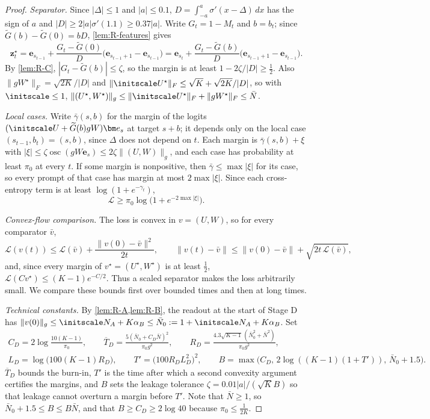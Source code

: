 \begin{proof}
\emph{Separator.} Since $|\Delta|\le1$ and $|a|\le0.1$, $D=\int_{-a}^{a}\sigma'(x-\Delta)\,dx$ has the sign of $a$ and $|D|\ge2|a|\sigma'(1.1)\ge0.37|a|$.
Write $G_t=1-M_t$ and $b=b_t$; since $\widetilde G(b)-\widetilde G(0)=bD$, \cref{lem:R-features} gives
\[
 \bm z^\star_t=\bm e_{s_{t-1}}+\frac{G_t-\widetilde G(0)}{D}\bigl(\bm e_{s_{t-1}+1}-\bm e_{s_{t-1}}\bigr)
 =\bm e_{s_t}+\frac{G_t-\widetilde G(b)}D\bigl(\bm e_{s_{t-1}+1}-\bm e_{s_{t-1}}\bigr).
\]
By \cref{lem:R-C}, $|G_t-\widetilde G(b)|\le\zeta$, so the margin is at least $1-2\zeta/|D|\ge\tfrac12$.
Also $\|gW^\star\|_F=\sqrt{2K}/|D|$ and $\|\initscale U^\star\|_F\le\sqrt K+\sqrt{2K}/|D|$, so with $\initscale\le1$,
$\|(U^\star,W^\star)\|_g\le\|\initscale U^\star\|_F+\|gW^\star\|_F\le\bar N$.

\emph{Local cases.} Write $\bar\gamma(s,b)$ for the margin of the logits $(\initscale U+\widetilde G(b)gW)\bm e_s$ at target $s+b$; it depends
only on the local case $(s_{t-1},b_t)=(s,b)$, since $\Delta$ does not depend on $t$. Each margin is $\bar\gamma(s,b)+\xi$ with
$|\xi|\le\zeta\operatorname{osc}(gW\bm e_s)\le2\zeta\|(U,W)\|_g$, and each case has probability at least $\pi_0$ at every $t$. If some margin is
nonpositive, then $\bar\gamma\le\max|\xi|$ for its case, so every prompt of that case has margin at most $2\max|\xi|$. Since each
cross-entropy term is at least $\log(1+e^{-\gamma_t})$,
\[
 \mathcal L\ge\pi_0\log\bigl(1+e^{-2\max|\xi|}\bigr).
\]

\emph{Convex-flow comparison.} The loss is convex in $v=(U,W)$, so for every comparator $\bar v$,
\[
 \mathcal L(v(t))\le\mathcal L(\bar v)+\frac{\|v(0)-\bar v\|^2}{2t},
 \qquad
 \|v(t)-\bar v\|\le\|v(0)-\bar v\|+\sqrt{2t\,\mathcal L(\bar v)},
\]
and, since every margin of $v^\star=(U^\star,W^\star)$ is at least $\tfrac12$, $\mathcal L(Cv^\star)\le(K-1)e^{-C/2}$. Thus a scaled separator makes
the loss arbitrarily small. We compare these bounds first over bounded times and then at long times.

\emph{Technical constants.} By \cref{lem:R-A,lem:R-B}, the readout at the start of Stage D has
$\|v(0)\|_g\le\initscale N_A+K\alpha_B\le\bar N_0:=1+\initscale N_A+K\alpha_B$. Set
\begin{equation}
 \begin{gathered}
 C_D=2\log\frac{10(K-1)}{\pi_0},\qquad
 \overline T_D=\frac{5(\bar N_0+C_D\bar N)^2}{\pi_0 g^2},\qquad
 R_D=\frac{4.3\sqrt{K-1}\,(\bar N_0^2+\bar N^2)}{\pi_0g^2},\\
 L_D=\log\bigl(100(K-1)R_D\bigr),\qquad
 T'=\bigl(100R_DL_D^2\bigr)^2,\qquad
 B=\max\bigl(C_D,\,2\log((K-1)(1+T')),\,\bar N_0+1.5\bigr).
 \end{gathered}
 \label{eq:R-Dconst}
\end{equation}
$\overline T_D$ bounds the burn-in, $T'$ is the time after which a second convexity argument certifies the margins, and $B$ sets the
leakage tolerance $\zeta=0.01|a|/(\sqrt KB)$ so that leakage cannot overturn a margin before $T'$. Note that $\bar N\ge1$, so
$\bar N_0+1.5\le B\le B\bar N$, and that $B\ge C_D\ge2\log40$ because $\pi_0\le\tfrac1{2K}$.


\end{proof}

